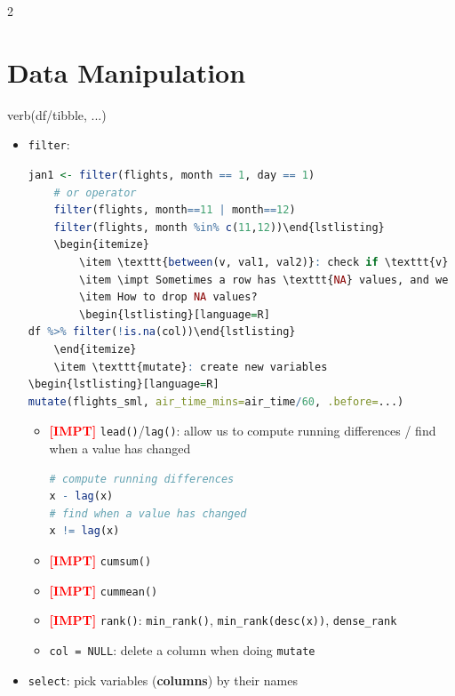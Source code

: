\documentclass{article}
\newcommand{\impt}[0]{\textcolor{red}{\textbf{[IMPT] }}}
\begin{document}
\begin{multicols}{2}
\section{Data Manipulation}
\begin{center}
	verb(df/tibble, ...)
\end{center}
\begin{itemize}
	\item \texttt{filter}:
	\begin{lstlisting}[language=R]
	jan1 <- filter(flights, month == 1, day == 1)
	# or operator
	filter(flights, month==11 | month==12)
	filter(flights, month %in% c(11,12))\end{lstlisting}
	\begin{itemize}
		\item \texttt{between(v, val1, val2)}: check if \texttt{v} is between the 2 values
		\item \impt Sometimes a row has \texttt{NA} values, and we can include the row to alter the data later using \texttt{is.na(x)}
		\item How to drop NA values?
		\begin{lstlisting}[language=R]
df %>% filter(!is.na(col))\end{lstlisting}
	\end{itemize}
	\item \texttt{mutate}: create new variables
\begin{lstlisting}[language=R]
mutate(flights_sml, air_time_mins=air_time/60, .before=...)\end{lstlisting}
\begin{itemize}
	\item \impt \texttt{lead()}/\texttt{lag()}: allow us to compute running differences / find when a value has changed
	\begin{lstlisting}[language=R]
# compute running differences
x - lag(x)
# find when a value has changed
x != lag(x)\end{lstlisting}
    \item \impt \texttt{cumsum()}
    \item \impt \texttt{cummean()}
    \item \impt \texttt{rank()}: \texttt{min\_rank()}, \texttt{min\_rank(desc(x))}, \texttt{dense\_rank}
    \item \texttt{col = NULL}: delete a column when doing \texttt{mutate}
\end{itemize}
	\item \texttt{select}: pick variables (\textbf{columns}) by their names

\end{itemize}
\end{multicols}
\end{document}

